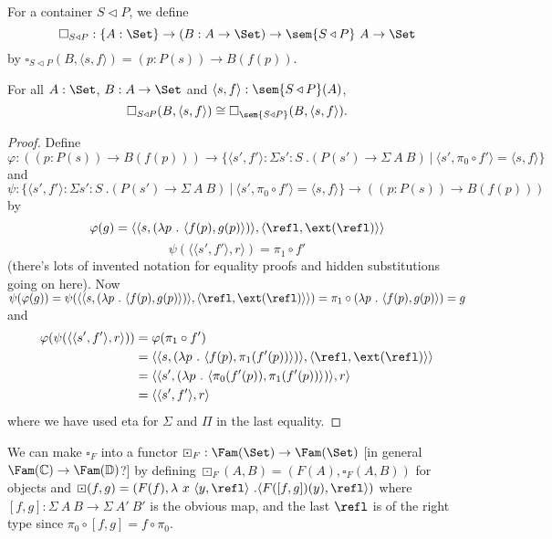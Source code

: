 \documentclass{article}
\begin{document}
\begin{definition}
  For a container $S \triangleleft P$, we define
  \[
  \square_{S \triangleleft P} : \{A : \Set\} \to (B : A \to \Set) \to \sem{S \triangleleft P}\ A \to \Set
  \]
  by  $\square_{S \triangleleft P}(B, \langle s , f\rangle) = (p : P(s)) \to B(f(p))$.
\end{definition}

\begin{problem}
   For all $A : \Set$, $B : A \to \Set$ and $\langle s , f \rangle : \sem{S \triangleleft P}(A)$, 
\[
\square_{S \triangleleft P}(B, \langle s , f \rangle) \cong \square_{\sem{S \triangleleft P}}(B, \langle s , f \rangle).
\] \label{problem2}
\end{problem}
\begin{proof}
  Define
  \[
    \varphi :  ((p : P(s)) \to B(f(p))) \to \{ \langle s', f'\rangle : \Sigma s' : S\ . (P(s') \to \Sigma\ A\ B )\ |\ \langle s' , \pi_0 \circ f'\rangle = \langle s, f\rangle\}
  \]
  and
  \[
 \psi : \{ \langle s', f'\rangle : \Sigma s' : S\ . (P(s') \to \Sigma\ A\ B )\ |\ \langle s' , \pi_0 \circ f'\rangle = \langle s, f\rangle\} \to ((p : P(s)) \to B(f(p)))
  \]
  by
  \[
  \varphi(g) = \langle \langle s, (\lambda p\ .\ \langle f(p), g(p)\rangle)\rangle, \langle\refl, \ext(\refl)\rangle\rangle \]\[
  \psi(\langle\langle s', f'\rangle, r \rangle) = \pi_1 \circ f'
  \]
(there's lots of invented notation for equality proofs and hidden substitutions going on here). Now
$\psi(\varphi(g)) = \psi(\langle \langle s, (\lambda p\ .\ \langle f(p), g(p)\rangle)\rangle, \langle\refl, \ext(\refl)\rangle\rangle) = \pi_1 \circ (\lambda p\ .\ \langle f(p), g(p)\rangle) = g$ and 
\begin{align*}
\varphi(\psi(\langle\langle s', f'\rangle, r \rangle)) &= \varphi(\pi_1 \circ f') \\
&= \langle \langle s, (\lambda p\ .\ \langle f(p), \pi_1(f'(p))\rangle)\rangle, \langle\refl, \ext(\refl)\rangle\rangle \\
&=  \langle \langle s', (\lambda p\ .\ \langle \pi_0(f'(p)), \pi_1(f'(p))\rangle)\rangle, r\rangle \\
&=  \langle \langle s', f'\rangle, r\rangle
\end{align*}
where we have used eta for $\Sigma$ and $\Pi$ in the last equality.

\end{proof}


We can make $\square_F$ into a functor $\boxdot_F : \Fam(\Set) \to
\Fam(\Set)$ [in general $\Fam(\mathbb{C}) \to \Fam(\mathbb{D})$?] by
defining $\boxdot_F(A, B) = (F(A), \square_F(A, B))$ for objects and
$\boxdot(f, g) = (F(f), \lambda\ x\ \langle y, \refl\rangle\ . \langle F([f,g])(y), \refl\rangle)$ where $[f,g] :
\Sigma\ A\ B \to \Sigma\ A'\ B'$ is the obvious map, and the last $\refl$ is of the right type since $\pi_0 \circ [f, g] = f \circ \pi_0$.
\end{document}
